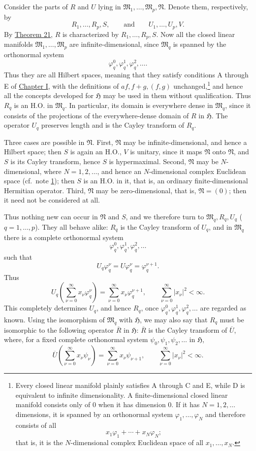 ﻿\documentclass[paper=b5,fontsize=13pt,bookmarkpackage=false,twoside]{scrartcl}
\begin{document}
Consider the parts of $R$ and $U$ lying in $\mathfrak M_1,\ldots,\mathfrak M_p,\mathfrak N$. Denote them, respectively, by
\[
R_1,\ldots,R_p,S,
\qquad\text{and}\qquad
U_1,\ldots,U_p,V.
\]
By \hyperref[thm:21]{Theorem 21}, $R$ is characterized by $R_1,\ldots,R_p,S$. Now all the closed linear manifolds $\mathfrak M_1,\ldots,\mathfrak M_p$ are infinite-dimensional, since $\mathfrak M_q$ is spanned by the orthonormal system
\[
\varphi_q^0,\varphi_q^1,\varphi_q^2,\ldots.
\]
Thus they are all Hilbert spaces, meaning that they satisfy conditions A through E of \hyperref[chap:I]{Chapter I}, with the definitions of $af,f+g,(f,g)$ unchanged,\footnote{\label{fn:56}Every closed linear manifold plainly satisfies A through C and E, while D is equivalent to infinite dimensionality. A finite-dimensional closed linear manifold consists only of $0$ when it has dimension $0$. If it has $N=1,2,\ldots$ dimensions, it is spanned by an orthonormal system $\varphi_1,\ldots,\varphi_N$ and therefore consists of all
\[
x_1\varphi_1+\cdots+x_N\varphi_N;
\]
that is, it is the $N$-dimensional complex Euclidean space of all $x_1,\ldots,x_N$.} and hence all the concepts developed for $\mathfrak H$ may be used in them without qualification. Thus $R_q$ is an H.O. in $\mathfrak M_q$. In particular, its domain is everywhere dense in $\mathfrak M_q$, since it consists of the projections of the everywhere-dense domain of $R$ in $\mathfrak H$. The operator $U_q$ preserves length and is the Cayley transform of $R_q$.

Three cases are possible in $\mathfrak N$. First, $\mathfrak N$ may be infinite-dimensional, and hence a Hilbert space; then $S$ is again an H.O., $V$ is unitary, since it maps $\mathfrak N$ onto $\mathfrak N$, and $S$ is its Cayley transform, hence $S$ is hypermaximal. Second, $\mathfrak N$ may be $N$-dimensional, where $N=1,2,\ldots$, and hence an $N$-dimensional complex Euclidean space (cf.\ note \ref{fn:56}); then $S$ is an H.O. in it, that is, an ordinary finite-dimensional Hermitian operator. Third, $\mathfrak N$ may be zero-dimensional, that is, $\mathfrak N=(0)$; then it need not be considered at all.

Thus nothing new can occur in $\mathfrak N$ and $S$, and we therefore turn to $\mathfrak M_q,R_q,U_q$ ($q=1,\ldots,p$). They all behave alike: $R_q$ is the Cayley transform of $U_q$, and in $\mathfrak M_q$ there is a complete orthonormal system
\[
\varphi_q^0,\varphi_q^1,\varphi_q^2,\ldots
\]
such that
\[
U_q\varphi_q^\nu=U\varphi_q^\nu=\varphi_q^{\nu+1}.
\]
Thus
\[
U_q\left(\sum_{\nu=0}^{\infty}x_\nu\varphi_q^\nu\right)
=
\sum_{\nu=0}^{\infty}x_\nu\varphi_q^{\nu+1},
\qquad
\sum_{\nu=0}^{\infty}|x_\nu|^2<\infty.
\]
This completely determines $U_q$, and hence $R_q$, once $\varphi_q^0,\varphi_q^1,\varphi_q^2,\ldots$ are regarded as known. Using the isomorphism of $\mathfrak M_q$ with $\mathfrak H$, we may also say that $R_q$ must be isomorphic to the following operator $\overline R$ in $\mathfrak H$: $\overline R$ is the Cayley transform of $\overline U$, where, for a fixed complete orthonormal system $\psi_0,\psi_1,\psi_2,\ldots$ in $\mathfrak H$,
\[
\overline U\left(\sum_{\nu=0}^{\infty}x_\nu\psi_\nu\right)
=
\sum_{\nu=0}^{\infty}x_\nu\psi_{\nu+1},
\qquad
\sum_{\nu=0}^{\infty}|x_\nu|^2<\infty.
\]
\end{document}
